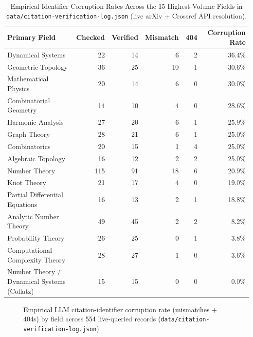 \documentclass[11pt,reqno]{amsart}
\theoremstyle{plain}
\theoremstyle{definition}
\newcommand{\code}[1]{{\upshape\nolinkurl{#1}}}
\begin{document}
\begin{table}[htbp]
\centering
\caption{Empirical Identifier Corruption Rates Across the 15 Highest-Volume Fields in
\code{data/citation-verification-log.json} (live arXiv + Crossref API resolution).}
\label{tab:field_corrupt}
\footnotesize
\begin{tabular}{@{}lrrrrr@{}}
\toprule
Primary Field & Checked & Verified & Mismatch & 404 & Corruption Rate \\
\midrule
Dynamical Systems & 22 & 14 & 6 & 2 & 36.4\% \\
Geometric Topology & 36 & 25 & 10 & 1 & 30.6\% \\
Mathematical Physics & 20 & 14 & 6 & 0 & 30.0\% \\
Combinatorial Geometry & 14 & 10 & 4 & 0 & 28.6\% \\
Harmonic Analysis & 27 & 20 & 6 & 1 & 25.9\% \\
Graph Theory & 28 & 21 & 6 & 1 & 25.0\% \\
Combinatorics & 20 & 15 & 1 & 4 & 25.0\% \\
Algebraic Topology & 16 & 12 & 2 & 2 & 25.0\% \\
Number Theory & 115 & 91 & 18 & 6 & 20.9\% \\
Knot Theory & 21 & 17 & 4 & 0 & 19.0\% \\
Partial Differential Equations & 16 & 13 & 2 & 1 & 18.8\% \\
Analytic Number Theory & 49 & 45 & 2 & 2 & 8.2\% \\
Probability Theory & 26 & 25 & 0 & 1 & 3.8\% \\
Computational Complexity Theory & 28 & 27 & 1 & 0 & 3.6\% \\
Number Theory / Dynamical Systems (Collatz) & 15 & 15 & 0 & 0 & 0.0\% \\
\bottomrule
\end{tabular}
\end{table}

\begin{figure}[htbp]
\centering
{}
\caption{Empirical LLM citation-identifier corruption rate (mismatches + 404s) by field across
554 live-queried records (\code{data/citation-verification-log.json}).}
\label{fig:corrupt_chart}
\end{figure}
\end{document}
